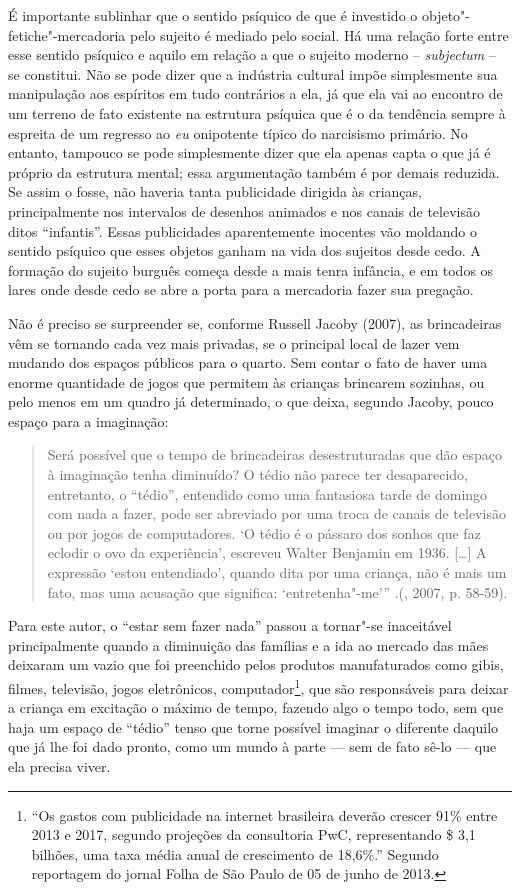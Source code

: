 {É importante sublinhar que o sentido psíquico de que é investido o
objeto"-fetiche"-mercadoria pelo sujeito é mediado pelo social. Há uma
relação forte entre esse sentido psíquico e aquilo em relação a que o
sujeito moderno -- \emph{subjectum} -- se constitui. Não se pode dizer
que a indústria cultural impõe simplesmente sua manipulação aos
espíritos em tudo contrários a ela, já que ela vai ao encontro de um
terreno de fato existente na estrutura psíquica que é o da tendência
sempre à espreita de um regresso ao \emph{eu} onipotente típico do
narcisismo primário. No entanto, tampouco se pode simplesmente dizer que
ela apenas capta o que já é próprio da estrutura mental; essa
argumentação também é por demais reduzida. Se assim o fosse, não haveria
tanta publicidade dirigida às crianças, principalmente nos intervalos de
desenhos animados e nos canais de televisão ditos ``infantis''. Essas
publicidades aparentemente inocentes vão moldando o sentido psíquico que
esses objetos ganham na vida dos sujeitos desde cedo. A formação do
sujeito burguês começa desde a mais tenra infância, e em todos os lares
onde desde cedo se abre a porta para a mercadoria fazer sua pregação.

Não é preciso se surpreender se, conforme Russell Jacoby (2007), as
brincadeiras vêm se tornando cada vez mais privadas, se o principal
local de lazer vem mudando dos espaços públicos para o quarto. Sem
contar o fato de haver uma enorme quantidade de jogos que permitem às
crianças brincarem sozinhas, ou pelo menos em um quadro já determinado,
o que deixa, segundo Jacoby, pouco espaço para a imaginação:

\begin{quote}
Será possível que o tempo de brincadeiras desestruturadas que dão espaço
à imaginação tenha diminuído? O tédio não parece ter desaparecido,
entretanto, o ``tédio'', entendido como uma fantasiosa tarde de domingo
com nada a fazer, pode ser abreviado por uma troca de canais de
televisão ou por jogos de computadores. `O tédio é o pássaro dos sonhos
que faz eclodir o ovo da experiência', escreveu Walter Benjamin em 1936.
[\ldots{}] A expressão `estou entendiado', quando dita por uma criança,
não é mais um fato, mas uma acusação que significa: `entretenha"-me'''
.(, 2007, p. 58-59).
\end{quote}

Para este autor, o ``estar sem fazer nada'' passou a tornar"-se
inaceitável principalmente quando a diminuição das famílias e a ida ao
mercado das mães deixaram um vazio que foi preenchido pelos produtos
manufaturados como gibis, filmes, televisão, jogos eletrônicos,
computador\footnote{``Os gastos com publicidade na internet brasileira
  deverão crescer 91\% entre 2013 e 2017, segundo projeções da
  consultoria PwC, representando \$ 3,1 bilhões, uma taxa média anual
  de crescimento de 18,6\%.'' Segundo reportagem do jornal Folha de São
  Paulo de 05 de junho de 2013.}, que são responsáveis para deixar a
criança em excitação o máximo de tempo, fazendo algo o tempo todo, sem
que haja um espaço de ``tédio'' tenso que torne possível imaginar o
diferente daquilo que já lhe foi dado pronto, como um mundo à parte ---
sem de fato sê-lo --- que ela precisa viver.

}
